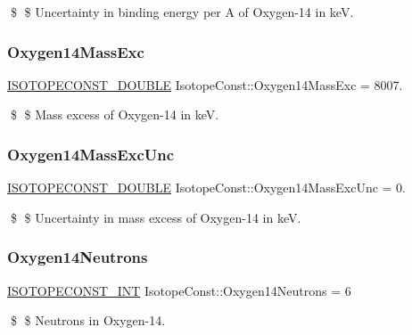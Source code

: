 \$ \$ Uncertainty in binding energy per A of Oxygen-\/14 in keV. \mbox{\label{group___isotope_const-_oxygen-_o14_ga9dd7ee91decd43abf8625bcbca3f6da0}} 
\subsubsection{\texorpdfstring{Oxygen14\+Mass\+Exc}{Oxygen14MassExc}}
{\footnotesize\ttfamily \mbox{\hyperlink{group___isotope_const-_macros_ga8f45a7272ce02c0b4c65c44636ed719a}{I\+S\+O\+T\+O\+P\+E\+C\+O\+N\+S\+T\+\_\+\+D\+O\+U\+B\+LE}} Isotope\+Const\+::\+Oxygen14\+Mass\+Exc = 8007.}

\$ \$ Mass excess of Oxygen-\/14 in keV. \mbox{\label{group___isotope_const-_oxygen-_o14_gad7d226f0221f90f3c701e0fa93514c8a}} 
\subsubsection{\texorpdfstring{Oxygen14\+Mass\+Exc\+Unc}{Oxygen14MassExcUnc}}
{\footnotesize\ttfamily \mbox{\hyperlink{group___isotope_const-_macros_ga8f45a7272ce02c0b4c65c44636ed719a}{I\+S\+O\+T\+O\+P\+E\+C\+O\+N\+S\+T\+\_\+\+D\+O\+U\+B\+LE}} Isotope\+Const\+::\+Oxygen14\+Mass\+Exc\+Unc = 0.}

\$ \$ Uncertainty in mass excess of Oxygen-\/14 in keV. \mbox{\label{group___isotope_const-_oxygen-_o14_gadd7226e55e1fbd067cb9c9bb68bb886f}} 
\subsubsection{\texorpdfstring{Oxygen14\+Neutrons}{Oxygen14Neutrons}}
{\footnotesize\ttfamily \mbox{\hyperlink{group___isotope_const-_macros_ga5f18360b3e99483a35c32d789e62621c}{I\+S\+O\+T\+O\+P\+E\+C\+O\+N\+S\+T\+\_\+\+I\+NT}} Isotope\+Const\+::\+Oxygen14\+Neutrons = 6}

\$ \$ Neutrons in Oxygen-\/14. \mbox{\label{group___isotope_const-_oxygen-_o14_gae094f457d57878ed46bb392d82bc338a}} 
